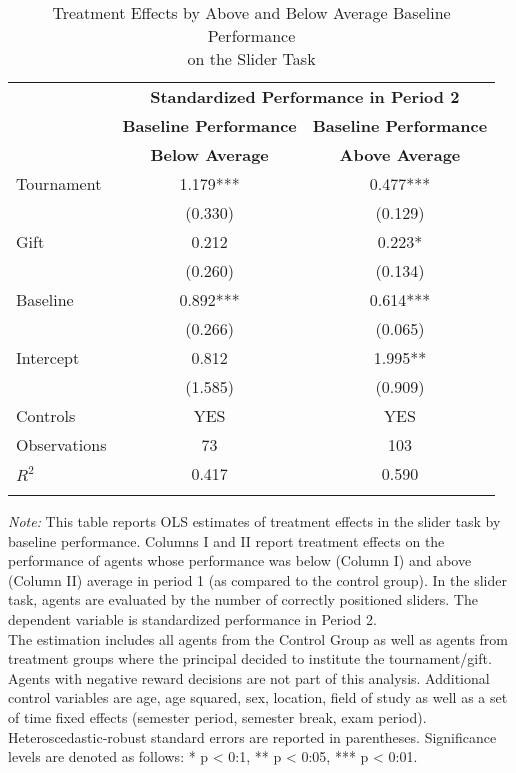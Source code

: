 \begin{table}[h]%
\captionsetup{justification=centering}
\setlength\tabcolsep{2pt}
\begin{center}%
\caption{Treatment Effects by Above and Below Average Baseline Performance \\ on the Slider Task}
\label{tab:BaselineReg}
{\small\renewcommand{\arraystretch}{1}%
\begin{tabular}{lcc}
\hline\hline\noalign{\smallskip}
 & \multicolumn{2}{c}{\bf Standardized Performance in Period 2} \\
\cline{2-3} 
 & \bf Baseline Performance & \bf Baseline Performance \\
 & \bf Below Average & \bf Above Average \\
\hline\noalign{\smallskip}
Tournament          &       1.179***&       0.477***\\
                    &     (0.330)   &     (0.129)   \\
Gift                &       0.212   &       0.223*  \\
                    &     (0.260)   &     (0.134)   \\
Baseline            &       0.892***&       0.614***\\
                    &     (0.266)   &     (0.065)   \\
Intercept           &       0.812   &       1.995** \\
                    &     (1.585)   &     (0.909)   \\
\hline
\noalign{\smallskip}
Controls & YES & YES  \\
\hline
\noalign{\smallskip}
Observations        &          73   &         103   \\
$R^2$               &       0.417   &       0.590   \\
\hline\hline\noalign{\medskip}
\end{tabular}}
\begin{minipage}{\textwidth}
\footnotesize {\it Note:} This table reports OLS estimates of treatment effects in the slider task by baseline performance. 
Columns I and II report treatment effects on the performance of agents whose performance was below (Column I) and above (Column II) average in period 1 (as compared to the control group). 
In the slider task, agents are evaluated by the number of correctly positioned sliders. 
The dependent variable is standardized performance in Period 2. \\
The estimation includes all agents from the Control Group as well as agents from treatment groups where the principal decided to institute the tournament/gift. Agents with negative reward decisions are not part of this analysis. 
Additional control variables are age, age squared, sex, location, field of study as well as a set of time fixed effects (semester period, semester break, exam period). 
Heteroscedastic-robust standard errors are reported in parentheses. Significance levels are denoted as follows: * p < 0:1, ** p < 0:05, *** p < 0:01. 
\end{minipage}
\end{center}
\end{table}
